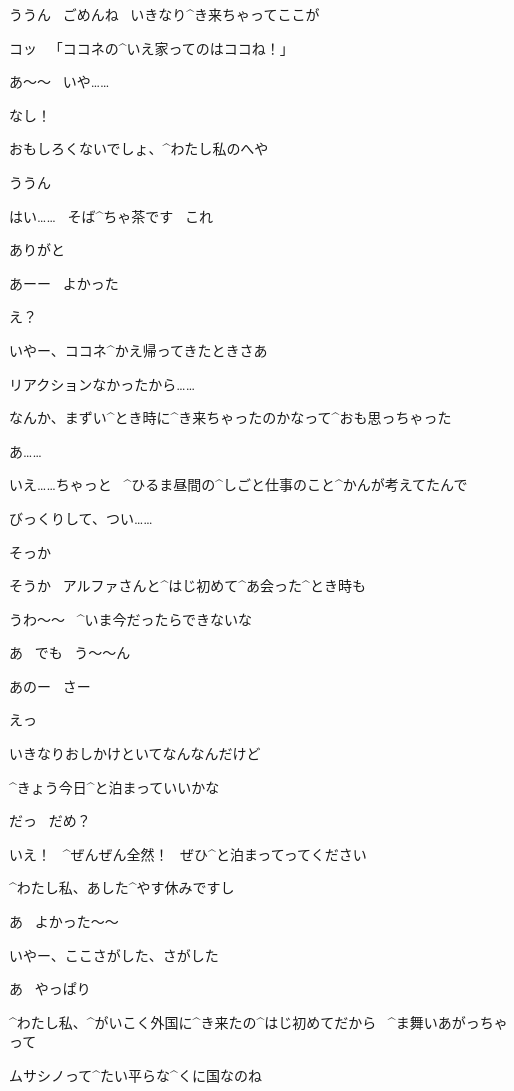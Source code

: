 \Alpha ううん
\ ごめんね
\ いきなり^{き}{来}ちゃってここが

\Alpha コッ
\ 「ココネの^{いえ}{家}ってのはココね！」

\Alpha あ〜〜
\ いや……

\Alpha なし！

\page[44]
\Kokone おもしろくないでしょ、^{わたし}{私}のへや

\Alpha ううん

\Kokone はい……
\ そば^{ちゃ}{茶}です
\ これ

\Alpha ありがと

\page[45]
\Alpha あーー
\ よかった

\Kokone え？

\Alpha いやー、ココネ^{かえ}{帰}ってきたときさあ

\Alpha リアクションなかったから……

\Alpha なんか、まずい^{とき}{時}に^{き}{来}ちゃったのかなって^{おも}{思}っちゃった

\Kokone あ……

\Kokone いえ……ちゃっと
\ ^{ひるま}{昼間}の^{しごと}{仕事}のこと^{かんが}{考}えてたんで

\Kokone びっくりして、つい……

\Alpha そっか

\page[46]
\Kokone そうか
\ アルファさんと^{はじ}{初}めて^{あ}{会}った^{とき}{時}も

\Kokone うわ〜〜
\ ^{いま}{今}だったらできないな

\Kokone あ
\ でも
\ う〜〜ん

\page[47]
\Alpha あのー
\ さー

\Kokone えっ

\Alpha いきなりおしかけといてなんなんだけど

\Alpha ^{きょう}{今日}^{と}{泊}まっていいかな

\Alpha だっ
\ だめ？

\Kokone いえ！
\ ^{ぜんぜん}{全然}！
\ ぜひ^{と}{泊}まってってください

\Kokone ^{わたし}{私}、あした^{やす}{休}みですし

\Alpha あ
\ よかった〜〜

\page[48]
\Alpha いやー、ここさがした、さがした

\Kokone あ
\ やっぱり

\Alpha ^{わたし}{私}、^{がいこく}{外国}に^{き}{来}たの^{はじ}{初}めてだから
\ ^{ま}{舞}いあがっちゃって

\Alpha ムサシノって^{たい}{平}らな^{くに}{国}なのね

